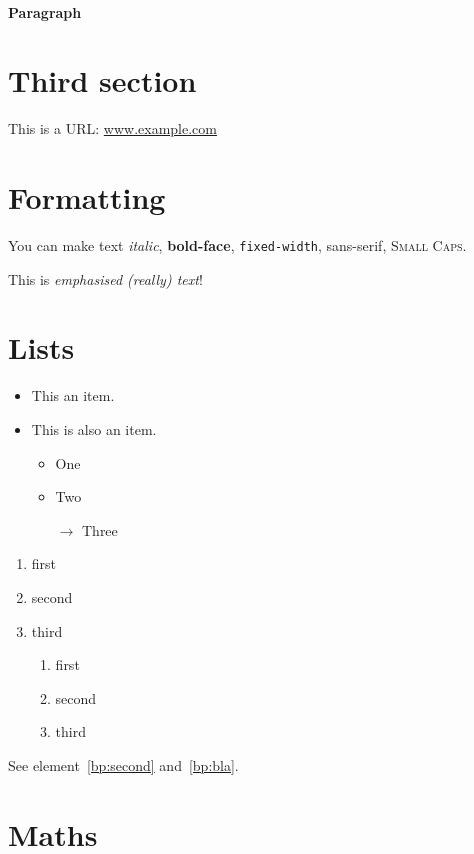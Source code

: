 \documentclass{scrartcl}
\begin{document}
\paragraph{Paragraph}

\section{Third section}

This is a URL:
\url{www.example.com}

\section{Formatting}

You can make text \textit{italic}, \textbf{bold-face}, \texttt{fixed-width},
\textsf{sans-serif}, \textsc{Small Caps}.

This is \emph{emphasised \emph{(really)} text}!

\section{Lists}

\begin{itemize}
  \item This an item.
  \item This is also an item.
    \begin{itemize}
      \item One
      \item Two
      \item[$\to$] Three
    \end{itemize}
\end{itemize}

\begin{enumerate}
  \item first
  \item\label{bp:second} second
  \item third
    \begin{enumerate}
      \item first
      \item\label{bp:bla} second
      \item third
    \end{enumerate}
\end{enumerate}

See element~\ref{bp:second} and~\ref{bp:bla}.

\section{Maths}
\end{document}
